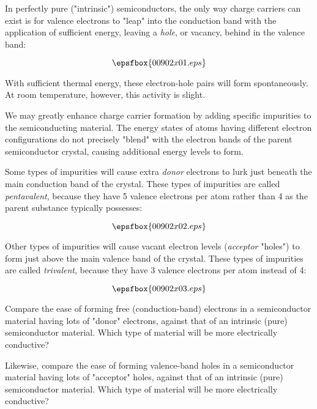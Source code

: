 

In perfectly pure ("intrinsic") semiconductors, the only way charge carriers can exist is for valence electrons to "leap" into the conduction band with the application of sufficient energy, leaving a {\it hole}, or vacancy, behind in the valence band:

$$\epsfbox{00902x01.eps}$$

With sufficient thermal energy, these electron-hole pairs will form spontaneously.  At room temperature, however, this activity is slight.   

We may greatly enhance charge carrier formation by adding specific impurities to the semiconducting material.  The energy states of atoms having different electron configurations do not precisely "blend" with the electron bands of the parent semiconductor crystal, causing additional energy levels to form.

Some types of impurities will cause extra {\it donor} electrons to lurk just beneath the main conduction band of the crystal.  These types of impurities are called {\it pentavalent}, because they have 5 valence electrons per atom rather than 4 as the parent substance typically possesses:

$$\epsfbox{00902x02.eps}$$

Other types of impurities will cause vacant electron levels ({\it acceptor} "holes") to form just above the main valence band of the crystal.  These types of impurities are called {\it trivalent}, because they have 3 valence electrons per atom instead of 4:

$$\epsfbox{00902x03.eps}$$

Compare the ease of forming free (conduction-band) electrons in a semiconductor material having lots of "donor" electrons, against that of an intrinsic (pure) semiconductor material.  Which type of material will be more electrically conductive?

Likewise, compare the ease of forming valence-band holes in a semiconductor material having lots of "acceptor" holes, against that of an intrinsic (pure) semiconductor material.  Which type of material will be more electrically conductive?






